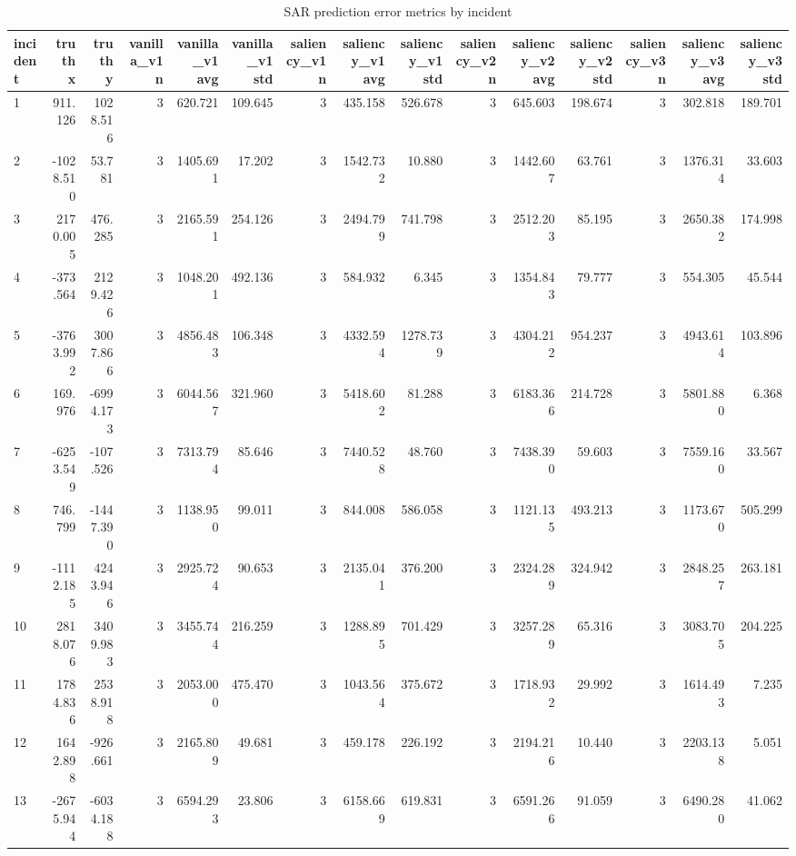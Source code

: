 \begin{table}[ht]
\centering
\caption{SAR prediction error metrics by incident}
\label{tab:sar-incident-errors}
\begin{tabular}{lrrrrrrrrrrrrrr}
\hline
incident & truth x & truth y & vanilla\_v1 n & vanilla\_v1 avg & vanilla\_v1 std & saliency\_v1 n & saliency\_v1 avg & saliency\_v1 std & saliency\_v2 n & saliency\_v2 avg & saliency\_v2 std & saliency\_v3 n & saliency\_v3 avg & saliency\_v3 std \\
\hline
1 & 911.126 & 1028.516 & 3 & 620.721 & 109.645 & 3 & 435.158 & 526.678 & 3 & 645.603 & 198.674 & 3 & 302.818 & 189.701 \\
2 & -1028.510 & 53.781 & 3 & 1405.691 & 17.202 & 3 & 1542.732 & 10.880 & 3 & 1442.607 & 63.761 & 3 & 1376.314 & 33.603 \\
3 & 2170.005 & 476.285 & 3 & 2165.591 & 254.126 & 3 & 2494.799 & 741.798 & 3 & 2512.203 & 85.195 & 3 & 2650.382 & 174.998 \\
4 & -373.564 & 2129.426 & 3 & 1048.201 & 492.136 & 3 & 584.932 & 6.345 & 3 & 1354.843 & 79.777 & 3 & 554.305 & 45.544 \\
5 & -3763.992 & 3007.866 & 3 & 4856.483 & 106.348 & 3 & 4332.594 & 1278.739 & 3 & 4304.212 & 954.237 & 3 & 4943.614 & 103.896 \\
6 & 169.976 & -6994.173 & 3 & 6044.567 & 321.960 & 3 & 5418.602 & 81.288 & 3 & 6183.366 & 214.728 & 3 & 5801.880 & 6.368 \\
7 & -6253.549 & -107.526 & 3 & 7313.794 & 85.646 & 3 & 7440.528 & 48.760 & 3 & 7438.390 & 59.603 & 3 & 7559.160 & 33.567 \\
8 & 746.799 & -1447.390 & 3 & 1138.950 & 99.011 & 3 & 844.008 & 586.058 & 3 & 1121.135 & 493.213 & 3 & 1173.670 & 505.299 \\
9 & -1112.185 & 4243.946 & 3 & 2925.724 & 90.653 & 3 & 2135.041 & 376.200 & 3 & 2324.289 & 324.942 & 3 & 2848.257 & 263.181 \\
10 & 2818.076 & 3409.983 & 3 & 3455.744 & 216.259 & 3 & 1288.895 & 701.429 & 3 & 3257.289 & 65.316 & 3 & 3083.705 & 204.225 \\
11 & 1784.836 & 2538.918 & 3 & 2053.000 & 475.470 & 3 & 1043.564 & 375.672 & 3 & 1718.932 & 29.992 & 3 & 1614.493 & 7.235 \\
12 & 1642.898 & -926.661 & 3 & 2165.809 & 49.681 & 3 & 459.178 & 226.192 & 3 & 2194.216 & 10.440 & 3 & 2203.138 & 5.051 \\
13 & -2675.944 & -6034.188 & 3 & 6594.293 & 23.806 & 3 & 6158.669 & 619.831 & 3 & 6591.266 & 91.059 & 3 & 6490.280 & 41.062 \\

\end{tabular}
\end{table}
